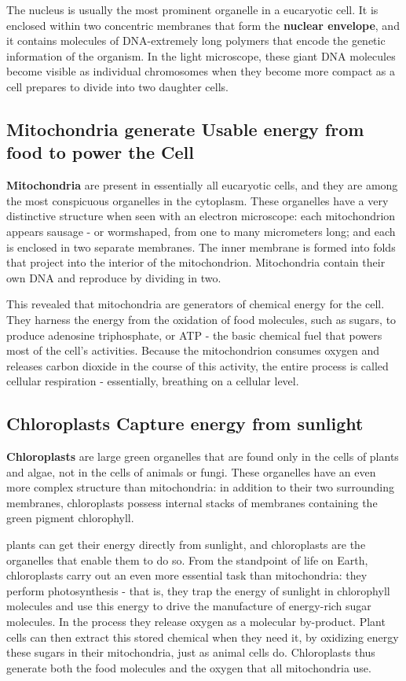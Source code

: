 The nucleus is usually the most prominent organelle in a eucaryotic cell.
It is enclosed within two concentric membranes that form
the \textbf{nuclear envelope}, and it contains molecules of DNA-extremely long
polymers that encode the genetic information of the organism. In the
light microscope, these giant DNA molecules become visible as individual
chromosomes when they become more compact as a cell prepares to
divide into two daughter cells.

\subsection{Mitochondria generate Usable energy from food to power the Cell}

\textbf{Mitochondria} are present in essentially all eucaryotic cells, and they are
among the most conspicuous organelles in the cytoplasm.
These organelles have a very distinctive structure when seen with an
electron microscope: each mitochondrion appears sausage - or wormshaped,
from one to many micrometers long; and each is enclosed in
two separate membranes. The inner membrane is formed into folds that
project into the interior of the mitochondrion. Mitochondria
contain their own DNA and reproduce by dividing in two.

This revealed that mitochondria are generators of
chemical energy for the cell. They harness the energy from the oxidation
of food molecules, such as sugars, to produce adenosine triphosphate,
or ATP - the basic chemical fuel that powers most of the cell’s activities.
Because the mitochondrion consumes oxygen and releases carbon
dioxide in the course of this activity, the entire process is called cellular
respiration - essentially, breathing on a cellular level.

\subsection{Chloroplasts Capture energy from sunlight}

\textbf{Chloroplasts} are large green organelles that are found only in the cells
of plants and algae, not in the cells of animals or fungi. These organelles
have an even more complex structure than mitochondria: in addition to
their two surrounding membranes, chloroplasts possess internal stacks
of membranes containing the green pigment chlorophyll.

plants can get their energy directly from sunlight, and chloroplasts are
the organelles that enable them to do so.
From the standpoint of life on Earth, chloroplasts carry out an even more
essential task than mitochondria: they perform photosynthesis - that is,
they trap the energy of sunlight in chlorophyll molecules and use this
energy to drive the manufacture of energy-rich sugar molecules. In the
process they release oxygen as a molecular by-product. Plant cells can
then extract this stored chemical when they need it, by oxidizing
energy these sugars in their mitochondria, just as animal cells do.
Chloroplasts thus generate both the food molecules and the oxygen that all
mitochondria use.

